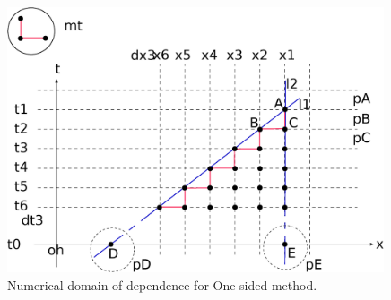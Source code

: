\begin{figure}[ht]
	\includegraphics[width=0.99\textwidth]{DomainOfDependenceTTR.eps}
	\caption{Numerical domain of dependence for One-sided method.}
	\label{\LABEL}
\end{figure}
